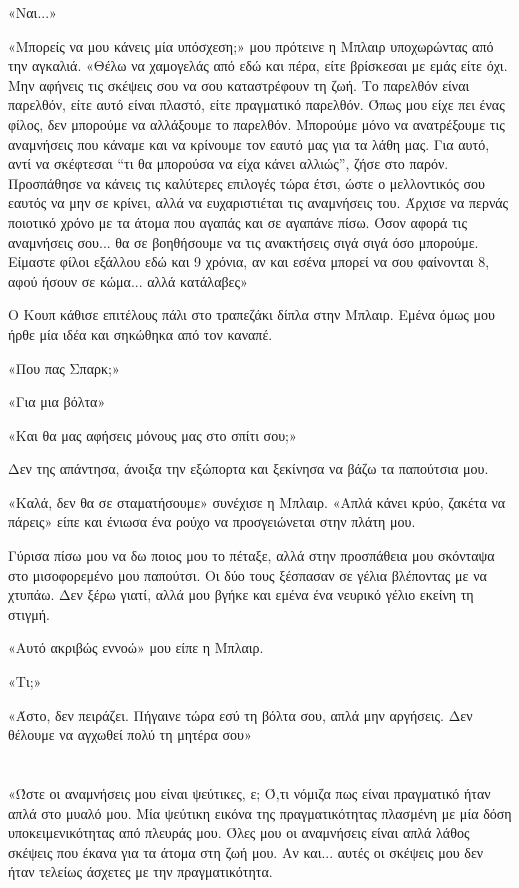 \documentclass[12pt,twoside, openany]{book}
\begin{document}
«Ναι...»

«Μπορείς να μου κάνεις μία υπόσχεση;» μου πρότεινε η Μπλαιρ υποχωρώντας από την αγκαλιά. «Θέλω να χαμογελάς από εδώ και πέρα, είτε βρίσκεσαι με εμάς είτε όχι. Μην αφήνεις τις σκέψεις σου να σου καταστρέφουν τη ζωή. Το παρελθόν είναι παρελθόν, είτε αυτό είναι πλαστό, είτε πραγματικό παρελθόν. Όπως μου είχε πει ένας φίλος, δεν μπορούμε να αλλάξουμε το παρελθόν. Μπορούμε μόνο να ανατρέξουμε τις αναμνήσεις που κάναμε και να κρίνουμε τον εαυτό μας για τα λάθη μας. Για αυτό, αντί να σκέφτεσαι “τι θα μπορούσα να είχα κάνει αλλιώς”, ζήσε στο παρόν. Προσπάθησε να κάνεις τις καλύτερες επιλογές τώρα έτσι, ώστε ο μελλοντικός σου εαυτός να μην σε κρίνει, αλλά να ευχαριστιέται τις αναμνήσεις του. Άρχισε να περνάς ποιοτικό χρόνο με τα άτομα που αγαπάς και σε αγαπάνε πίσω. Όσον αφορά τις αναμνήσεις σου... θα σε βοηθήσουμε να τις ανακτήσεις σιγά σιγά όσο μπορούμε. Είμαστε φίλοι εξάλλου εδώ και 9 χρόνια, αν και εσένα μπορεί να σου φαίνονται 8, αφού ήσουν σε κώμα... αλλά κατάλαβες»

Ο Κουπ κάθισε επιτέλους πάλι στο τραπεζάκι δίπλα στην Μπλαιρ. Εμένα όμως μου ήρθε μία ιδέα και σηκώθηκα από τον καναπέ.

«Που πας Σπαρκ;»

«Για μια βόλτα»

«Και θα μας αφήσεις μόνους μας στο σπίτι σου;»

Δεν της απάντησα, άνοιξα την εξώπορτα και ξεκίνησα να βάζω τα παπούτσια μου.

«Καλά, δεν θα σε σταματήσουμε» συνέχισε η Μπλαιρ. «Απλά κάνει κρύο, ζακέτα να πάρεις» είπε και ένιωσα ένα ρούχο να προσγειώνεται στην πλάτη μου.

Γύρισα πίσω μου να δω ποιος μου το πέταξε, αλλά στην προσπάθεια μου σκόνταψα στο μισοφορεμένο μου παπούτσι. Οι δύο τους ξέσπασαν σε γέλια βλέποντας με να χτυπάω. Δεν ξέρω γιατί, αλλά μου βγήκε και εμένα ένα νευρικό γέλιο εκείνη τη στιγμή.

«Αυτό ακριβώς εννοώ» μου είπε η Μπλαιρ.

«Τι;»

«Άστο, δεν πειράζει. Πήγαινε τώρα εσύ τη βόλτα σου, απλά μην αργήσεις. Δεν θέλουμε να αγχωθεί πολύ τη μητέρα σου»

\chapter{}

«Ώστε οι αναμνήσεις μου είναι ψεύτικες, ε; Ό,τι νόμιζα πως είναι πραγματικό ήταν απλά στο μυαλό μου. Μία ψεύτικη εικόνα της πραγματικότητας πλασμένη με μία δόση υποκειμενικότητας από πλευράς μου. Όλες μου οι αναμνήσεις είναι απλά λάθος σκέψεις που έκανα για τα άτομα στη ζωή μου. Αν και... αυτές οι σκέψεις μου δεν ήταν τελείως άσχετες με την πραγματικότητα.
\end{document}
